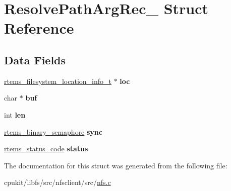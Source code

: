 \hypertarget{structResolvePathArgRec__}{}\section{Resolve\+Path\+Arg\+Rec\+\_\+ Struct Reference}
\label{structResolvePathArgRec__}
\subsection*{Data Fields}
\begin{DoxyCompactItemize}
\item 
\mbox{\label{structResolvePathArgRec___a276d94ac1fcb42e2e480da3e331336d7}} 
\mbox{\hyperlink{group__LibIO_ga3252b3d31ee3c49ffff0b7604a676864}{rtems\+\_\+filesystem\+\_\+location\+\_\+info\+\_\+t}} $\ast$ {\bfseries loc}
\item 
\mbox{\label{structResolvePathArgRec___a9dc3303c031a9d652fe44ad7f65d472b}} 
char $\ast$ {\bfseries buf}
\item 
\mbox{\label{structResolvePathArgRec___ac46bb6a3bd8ecc7f7c0ed4378c9d5f66}} 
int {\bfseries len}
\item 
\mbox{\label{structResolvePathArgRec___a1fdf27438f21ed63ec07419e63a6a752}} 
\mbox{\hyperlink{structrtems__binary__semaphore}{rtems\+\_\+binary\+\_\+semaphore}} {\bfseries sync}
\item 
\mbox{\label{structResolvePathArgRec___a0a35a0c7c44b9d8cb461a8f26a75d0aa}} 
\mbox{\hyperlink{group__ClassicStatus_ga545d41846817eaba6143d52ee4d9e9fe}{rtems\+\_\+status\+\_\+code}} {\bfseries status}
\end{DoxyCompactItemize}


The documentation for this struct was generated from the following file\+:\begin{DoxyCompactItemize}
\item 
cpukit/libfs/src/nfsclient/src/\mbox{\hyperlink{nfs_8c}{nfs.\+c}}\end{DoxyCompactItemize}
